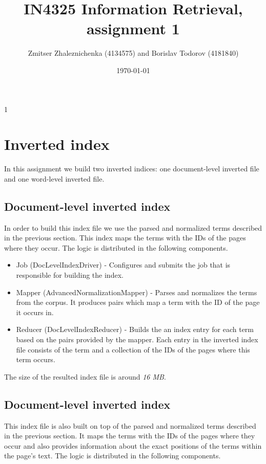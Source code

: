 \documentclass[a4paper, notitlepage]{report}
\begin{document}
\title{IN4325 Information Retrieval, assignment 1}
\author{Zmitser Zhaleznichenka (4134575) and Borislav Todorov (4181840)}
\date{\today}
\maketitle

\begin{description}
\item[1] \hfill

\end{description}

\section{Inverted index}
In this assignment we build two inverted indices: one document-level inverted file and one word-level inverted file.

\subsection{Document-level inverted index}
In order to build this index file we use the parsed and normalized terms described in the previous section. This index maps the terms with the IDs of the pages where they occur. The logic is distributed in the following components.

\begin{itemize}
	\item Job (DocLevelIndexDriver) - Configures and submits the job that is responsible for building the index.
	\item Mapper (AdvancedNormalizationMapper) - Parses and normalizes the terms from the corpus. It produces pairs which map a term with the ID of the page it occurs in.
	\item Reducer (DocLevelIndexReducer) - Builds the an index entry for each term based on the pairs provided by the mapper. Each entry in the inverted index file consists of the term and a collection of the IDs of the pages where this term occurs.  
\end{itemize}

The size of the resulted index file is around \emph{16 MB}.
\subsection{Document-level inverted index}
This index file is also built on top of the parsed and normalized terms described in the previous section. It maps the terms with the IDs of the pages where they occur and also provides information about the exact positions of the terms within the page's text. The logic is distributed in the following components.
\end{document}
